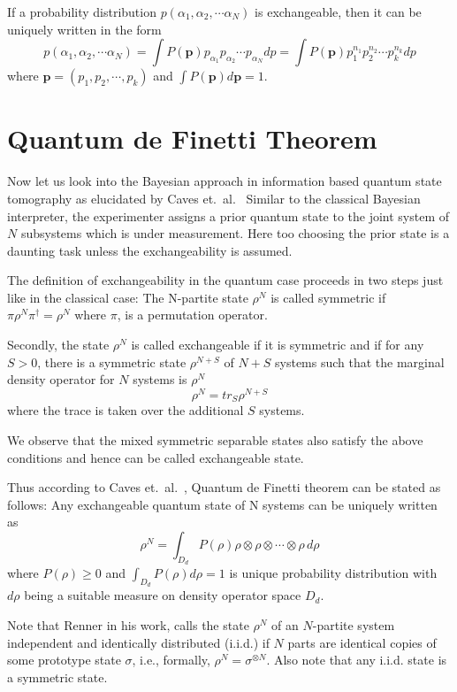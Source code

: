 If a probability distribution $p(\alpha_{1}, \alpha_{2}, \cdots \alpha_{N})$ is exchangeable, then it can be uniquely written in the form
$$
p(\alpha_{1}, \alpha_{2}, \cdots \alpha_{N}) = \int P(\textbf{p}) p_{\alpha_{1}} p_{\alpha_{2}} \cdots p_{\alpha_{N}}  dp = \int P(\textbf{p}) p_{1}^{n_{1}} p_{2}^{n_{2}} \cdots p_{k}^{n_{k}} dp
$$ 
where $\textbf{p} = (p_{1}, p_{2}, \cdots, p_{k} )$ and $\int P(\textbf{p}) d\textbf{p} = 1$.


\section{Quantum de Finetti Theorem}\label{chap27-sec3}

Now let us look into the Bayesian approach in information based quantum state tomography as elucidated by Caves et.\ al.\ \cite{chap27-key8} Similar to the classical Bayesian interpreter, the experimenter assigns a prior quantum state to the joint system of $N$ subsystems which is under measurement. Here too choosing the prior state is a daunting task unless the exchangeability is assumed.

The definition of exchangeability in the quantum case proceeds in two steps just like in the classical case:
The N-partite state $\rho^{N}$ is called symmetric if $\pi \rho^{N} \pi^{\dagger} = \rho^{N}$ where $\pi$, is a permutation operator.

Secondly, the state $\rho^{N}$ is called exchangeable if it is symmetric and if for any $S > 0$, there is a symmetric state $\rho^{N+S}$ of $N+S$ systems such that the marginal density operator for $N$ systems is $\rho^{N}$
$$
\rho^{N} = tr_{S} \rho^{N+S}
$$ 
where the trace is taken over the additional $S$ systems.

We observe that the mixed symmetric separable states also satisfy the above conditions and hence can be called exchangeable state.

Thus according to Caves et.\ al.\ \cite{chap27-key8}, Quantum de Finetti theorem can be stated as follows:
Any exchangeable quantum state of N systems can be uniquely written as 
$$
\rho^{N} = \int_{D_{d}} P(\rho) \rho \otimes \rho \otimes \cdots \otimes \rho\,d\rho
$$ 
where $P(\rho) \geq 0$ and $\int_{D_{d}} P(\rho) d\rho = 1$ is unique probability distribution with $d\rho$ being a suitable measure on density operator space $D_{d}$.

Note that Renner \cite{chap27-key1} in his work, calls the state $\rho^{N}$ of an $N$-partite system independent and identically distributed (i.i.d.) if $N$ parts are identical copies of some prototype state $\sigma$, i.e., formally, $\rho^{N} = \sigma^{\otimes N}$. Also note that any i.i.d. state is a symmetric state.


